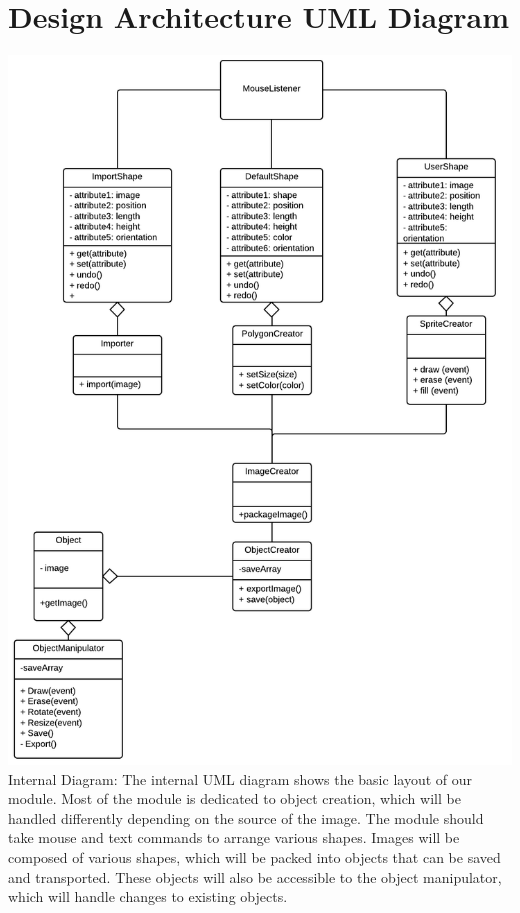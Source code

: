 \documentclass[a4paper, 11pt]{article} %
\begin{document}
\section*{Design Architecture UML Diagram}
\includegraphics[scale=0.52]{ClassDiagramObjectModule}\\
Internal Diagram: The internal UML diagram shows the basic layout of our module. Most of the module is dedicated to object creation, which will be handled differently depending on the source of the image. The module should take mouse and text commands to arrange various shapes.  Images will be composed of various shapes, which will be packed into objects that can be saved and transported. These objects will also be accessible to the object manipulator, which will handle changes to existing objects.\\
\end{document}
